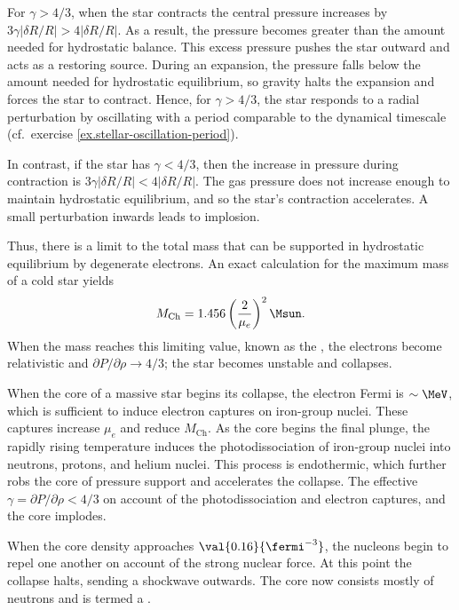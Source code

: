 \begin{sidebar}
For $\gamma > 4/3$, when the star contracts the central pressure increases by $3\gamma|\delta R/R| > 4|\delta R/R|$. As a result, the pressure becomes greater than the amount needed for hydrostatic balance. This excess pressure pushes the star outward and acts as a restoring source. During an expansion, the pressure falls below the amount needed for hydrostatic equilibrium, so gravity halts the expansion and forces the star to contract. Hence, for $\gamma > 4/3$, the star responds to a radial perturbation by oscillating with a period comparable to the dynamical timescale (cf.\ exercise \ref{ex.stellar-oscillation-period}).

In contrast, if the star has $\gamma < 4/3$, then the increase in pressure during contraction is $3\gamma|\delta R/R| < 4|\delta R/R|$. The gas pressure does not increase enough to maintain hydrostatic equilibrium, and so the star's contraction accelerates. A small perturbation inwards leads to implosion.
\end{sidebar}

Thus, there is a limit to the total mass that can be supported in hydrostatic equilibrium by degenerate electrons. 
An exact calculation for the maximum mass of a cold star yields
\begin{equation}\label{e.Chandrasekhar}
	M_{\mathrm{Ch}} = 1.456 \left(\frac{2}{\mu_{e}}\right)^{2}\Msun.
\end{equation}
When the mass reaches this limiting value, known as the , the electrons become relativistic and $\partial P/\partial \rho \to 4/3$; the star becomes unstable and collapses.

When the core of a massive star begins its collapse, the electron Fermi is $\sim\MeV$, which is sufficient to induce electron captures on iron-group nuclei. These captures increase $\mu_{e}$ and reduce $M_{\mathrm{Ch}}$. As the core begins the final plunge, the rapidly rising temperature induces the photodissociation of iron-group nuclei into neutrons, protons, and helium nuclei. This process is endothermic, which further robs the core of pressure support and accelerates the collapse. The effective $\gamma = \partial P/\partial\rho < 4/3$ on account of the photodissociation and electron captures, and the core implodes.

When the core density approaches $\val{0.16}{\fermi^{-3}}$, the nucleons begin to repel one another on account of the strong nuclear force. At this point the collapse halts, sending a shockwave outwards. The core now consists mostly of neutrons and is termed a .

